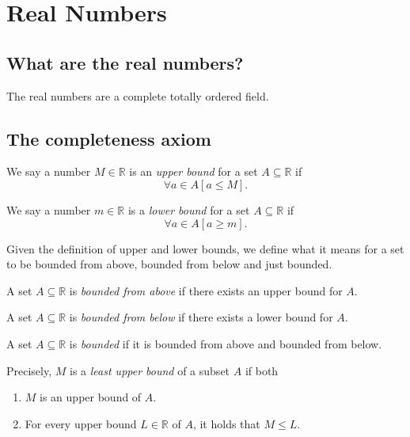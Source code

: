 \section{Real Numbers}

\subsection{What are the real numbers?}
\begin{definition}
    The real numbers are a complete totally ordered field.
\end{definition}

\subsection{The completeness axiom}

\begin{definition}
    We say a number $M \in \mathbb{R}$ is an \emph{upper bound} for a set $A \subseteq \mathbb{R}$ if
    $$\forall a \in A [a \le M].$$

    We say a number $m \in \mathbb{R}$ is a \emph{lower bound} for a set $A \subseteq \mathbb{R}$ if
    $$\forall a \in A [a \ge m].$$
\end{definition}

Given the definition of upper and lower bounds, we define what it means
for a set to be bounded from above, bounded from below and just bounded.

\begin{definition}
    A set $A \subseteq \mathbb{R}$ is \emph{bounded from above} if there exists an upper bound for $A$.

    A set $A \subseteq \mathbb{R}$ is \emph{bounded from below} if there exists a lower bound for $A$.

    A set $A \subseteq \mathbb{R}$ is \emph{bounded} if it is bounded from above and bounded from below.
\end{definition}

\begin{definition}
    Precisely, $M$ is a \emph{least upper bound} of a subset $A$ if both
    \begin{enumerate}
        \item $M$ is an upper bound of $A$.
        \item For every upper bound $L \in \mathbb{R}$ of $A$, it holds that $M \le L$.
    \end{enumerate}
\end{definition}

